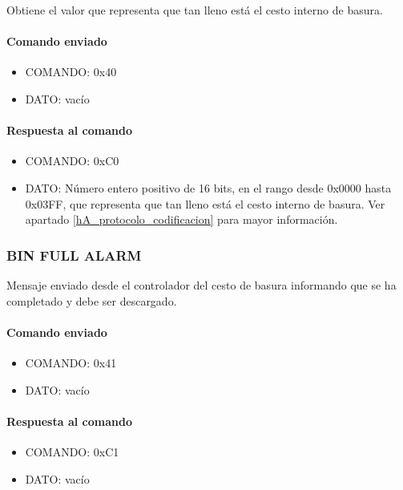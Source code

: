 Obtiene el valor que representa que tan lleno est\'a el cesto interno de basura.

\paragraph*{Comando enviado}

\begin{itemize}
	\item{COMANDO:} 0x40
	\item{DATO:} vac\'io
\end{itemize}

\paragraph*{Respuesta al comando}

\begin{itemize}
	\item{COMANDO:} 0xC0
	\item{DATO:} N\'umero entero positivo de 16 bits, en el rango desde 0x0000 hasta 0x03FF,
		que representa que tan lleno est\'a el cesto interno de basura.
		Ver apartado \ref{hA_protocolo_codificacion} para mayor informaci\'on.
\end{itemize}

\subsubsection{BIN FULL ALARM}
\label{hA_protocolo_bin_full_alarm}

Mensaje enviado desde el controlador del cesto de basura informando que se ha completado y debe ser descargado.

\paragraph*{Comando enviado}

\begin{itemize}
	\item{COMANDO:} 0x41
	\item{DATO:} vac\'io
\end{itemize}

\paragraph*{Respuesta al comando}

\begin{itemize}
	\item{COMANDO:} 0xC1
	\item{DATO:} vac\'io
\end{itemize}

